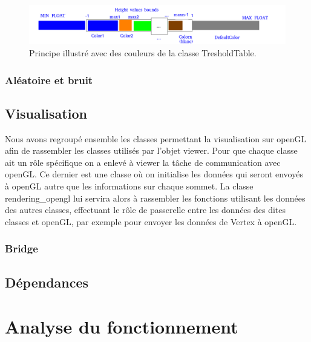 \documentclass[a4paper]{article}
\begin{document}
\begin{figure}[!h]
        \begin{center} \includegraphics[width=\linewidth]{img/archi/example_treshold.png}\end{center}
        \caption{\label{archi_treshold}Principe illustré avec des couleurs de la classe TresholdTable.}
\end{figure}


\subsubsection{Aléatoire et bruit}


\subsection{Visualisation}

Nous avons regroupé ensemble les classes permettant la visualisation sur openGL afin de rassembler les classes utilisés par l'objet viewer. Pour que chaque classe ait un rôle spécifique on a enlevé à viewer la tâche de communication avec openGL. Ce dernier est une classe où on initialise  les données qui seront envoyés à openGL  autre que les informations sur chaque sommet. La classe rendering\_opengl lui servira alors à rassembler les fonctions utilisant les données des autres classes, effectuant le rôle de passerelle entre les données des dites classes et openGL, par exemple pour envoyer les données de Vertex à openGL.

\subsubsection{Bridge}

\subsection{Dépendances}


\newpage 
\section{Analyse du fonctionnement}
\end{document}
